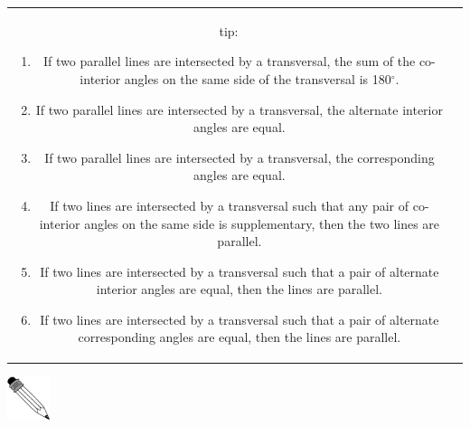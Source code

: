 \begin{table}[H]
\begin{tabular}{cc}
	\begin{minipage}{0.85\textwidth}
	\begin{note}
      {tip: }
        \label{m38380*id317145}\begin{enumerate}[noitemsep, label=\textbf{\arabic*}. ] 
            \label{m38380*uid31}\item If two parallel lines are intersected by a transversal, the sum of the co-interior angles on the same side of the transversal is 180\begin{math}{}^{\circ }\end{math}.
\label{m38380*uid32}\item If two parallel lines are intersected by a transversal, the alternate interior angles are equal.
\label{m38380*uid33}\item If two parallel lines are intersected by a transversal, the corresponding angles are equal.
\label{m38380*uid34}\item If two lines are intersected by a transversal such that any pair of co-interior angles on the same side is supplementary, then the two lines are parallel.
\label{m38380*uid35}\item If two lines are intersected by a transversal such that a pair of alternate interior angles are equal, then the lines are parallel.
\label{m38380*uid36}\item If two lines are intersected by a transversal such that a pair of alternate corresponding angles are equal, then the lines are parallel.
\end{enumerate}
        

	\end{note}
	\end{minipage}
	\end{tabular}
	\par
      
\par \pagebreak
            \label{m38380*eip-499}\vspace{.5cm} 
      
      \noindent
      \hspace*{-30pt}\includegraphics[width=0.5in]{col11306.imgs/pspencil2.png}   
\end{table}

